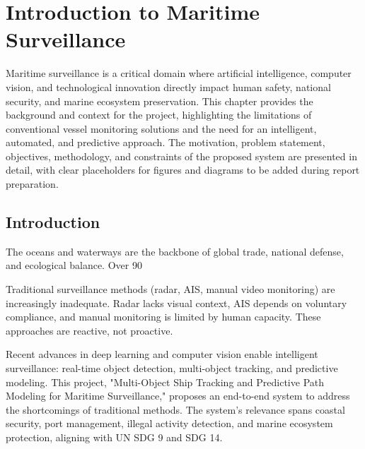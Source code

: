 \chapter{Introduction to Maritime Surveillance}

Maritime surveillance is a critical domain where artificial intelligence, computer vision, and technological innovation directly impact human safety, national security, and marine ecosystem preservation. This chapter provides the background and context for the project, highlighting the limitations of conventional vessel monitoring solutions and the need for an intelligent, automated, and predictive approach. The motivation, problem statement, objectives, methodology, and constraints of the proposed system are presented in detail, with clear placeholders for figures and diagrams to be added during report preparation.


\section[Introduction]{\textbf{Introduction}}

The oceans and waterways are the backbone of global trade, national defense, and ecological balance. Over 90%

Traditional surveillance methods (radar, AIS, manual video monitoring) are increasingly inadequate. Radar lacks visual context, AIS depends on voluntary compliance, and manual monitoring is limited by human capacity. These approaches are reactive, not proactive.

Recent advances in deep learning and computer vision enable intelligent surveillance: real-time object detection, multi-object tracking, and predictive modeling. This project, "Multi-Object Ship Tracking and Predictive Path Modeling for Maritime Surveillance," proposes an end-to-end system to address the shortcomings of traditional methods. The system’s relevance spans coastal security, port management, illegal activity detection, and marine ecosystem protection, aligning with UN SDG 9 and SDG 14.

